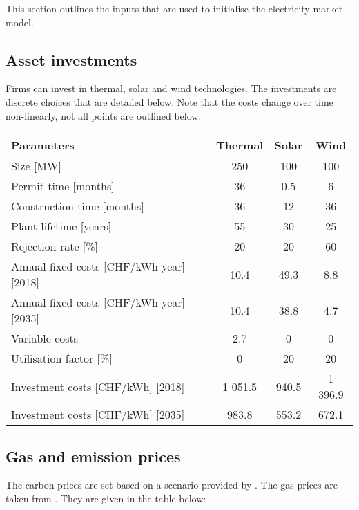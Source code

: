 This section outlines the inputs that are used to initialise the electricity market model.

\subsection{Asset investments}

Firms can invest in thermal, solar and wind technologies. The investments are discrete choices that are detailed below. Note that the costs change over time non-linearly, not all points are outlined below.

\begin{center}
\begin{tabular}{ |l|c|c|c| } 
\hline
Parameters			& Thermal		& Solar	& Wind	\\ \hline \hline
Size [MW]				& 250 		& 100	& 100	\\ \hline
Permit time [months]		& 36			& 0.5		& 6		\\ \hline
Construction time [months]	
					& 36			& 12		& 36		\\ \hline
Plant lifetime [years]		& 55			& 30		& 25		\\ \hline
Rejection rate [\%]		& 20			& 20		& 60		\\ \hline
Annual fixed costs [CHF/kWh-year][2018]
					& 10.4		& 49.3	& 8.8		\\ \hline
Annual fixed costs [CHF/kWh-year][2035]
					& 10.4		& 38.8	& 4.7		\\ \hline				
Variable costs			& 2.7			& 0		& 0		\\ \hline
Utilisation factor [\%]		& 0			& 20		& 20		 \\ \hline
Investment costs [CHF/kWh] [2018]
					& 1 051.5 		& 940.5 	& 1 396.9	\\ \hline
Investment costs [CHF/kWh] [2035]
					& 983.8 		& 553.2 	& 672.1	\\ \hline
\end{tabular}
\end{center}


\subsection{Gas and emission prices}

The carbon prices are set based on a scenario provided by \cite{demiray2018Modellierung}. The gas prices are taken from \cite{NREL2018annual}. They are given in the table below:
			
